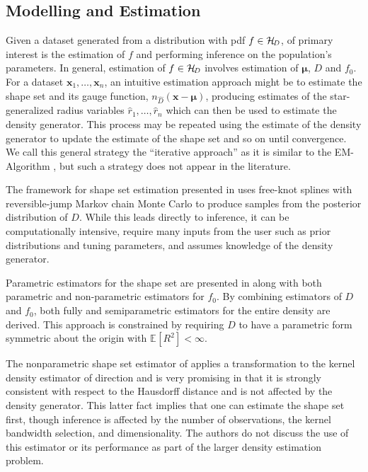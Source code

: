 \documentclass[]{article}
\numberwithin{equation}{section}
\newcommand{\brac}[1]{\left[ #1 \right]} %
\newcommand{\est}[1]{\widehat{#1}}
\newcommand{\Exp}[2][]{\mathbb{E}_{#1}\brac{ #2 }} %
\newcommand{\fncDtest}[3][D]{#2\!_{#1\!}\!\paren{#3}} %
\newcommand{\HC}[1]{\cal{H}\!_{\mathit{#1}}} %
\newcommand{\mub}{\bm{{\mu}}} %
\newcommand{\nf}{\infty} %
\newcommand{\paren}[1]{\left( #1 \right)} %
\newcommand{\xb}{\mathbf{x}}
\begin{document}
\hypertarget{SS:intro-modelling}{%
\subsection{Modelling and Estimation}\label{SS:intro-modelling}}

Given a dataset generated from a distribution with \ac{pdf} \(f\in\HC{D}\), of primary interest is the estimation of \(f\) and performing inference on the population's parameters. In general, estimation of \(f \in \HC{D}\) involves estimation of \(\mub\), \(D\) and \(f_0\). For a dataset \(\xb_1, \dots, \xb_n\), an intuitive estimation approach might be to estimate the shape set and its gauge function, \(\fncDtest[\est{D}]{n}{\xb - \mub}\), producing estimates of the star-generalized radius variables \(\est{r}_1, \dots, \est{r}_n\) which can then be used to estimate the density generator. This process may be repeated using the estimate of the density generator to update the estimate of the shape set and so on until convergence. We call this general strategy the ``iterative approach'' as it is similar to the EM-Algorithm \citep{Dempster1977}, but such a strategy does not appear in the literature.

The framework for shape set estimation presented in \citet{Ferreira2005} uses free-knot splines with reversible-jump Markov chain Monte Carlo to produce samples from the posterior distribution of \(D\). While this leads directly to inference, it can be computationally intensive, require many inputs from the user such as prior distributions and tuning parameters, and assumes knowledge of the density generator.

Parametric estimators for the shape set are presented in \citet{Liebscher2016} along with both parametric and non-parametric estimators for \(f_0\). By combining estimators of \(D\) and \(f_0\), both fully and semiparametric estimators for the entire density are derived. This approach is constrained by requiring \(D\) to have a parametric form symmetric about the origin with \(\Exp{R^2} < \nf\).

The nonparametric shape set estimator of \citet{Kamiya2019} applies a transformation to the kernel density estimator of direction and is very promising in that it is strongly consistent with respect to the Hausdorff distance and is not affected by the density generator. This latter fact implies that one can estimate the shape set first, though inference is affected by the number of observations, the kernel bandwidth selection, and dimensionality. The authors do not discuss the use of this estimator or its performance as part of the larger density estimation problem.
\end{document}

